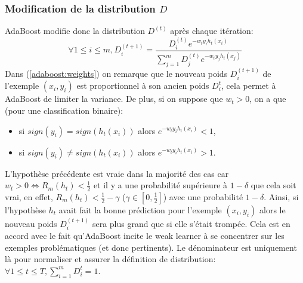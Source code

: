 \documentclass[12pt]{article}
\begin{document}
	
	\subsubsection{Modification de la distribution $D$}
	\label{adaboost:newdistrib}
	AdaBoost modifie donc la distribution $D^{(t)}$ après chaque itération: 
	\begin{equation}
		\label{adaboost:weights}
		\forall 1 \leq i \leq m, D^{(t+1)}_i = \frac{D^{(t)}_i e^{-w_t y_i h_t(x_i)}}{\sum_{j=1}^m D^{(t)}_j e^{-w_t y_j h_t(x_j)}} 
	\end{equation}   
	Dans (\ref{adaboost:weights}) on remarque que le nouveau poids $D^{(t+1)}_i$ de l'exemple $(x_i,y_i)$ est proportionnel à son ancien poids $D^{t}_i$, cela permet à AdaBoost de limiter la variance. De plus, si on suppose que $w_t > 0$, on a que (pour une classification binaire):
	\begin{itemize}
		\item si $sign(y_i)=sign(h_t(x_i))$ alors $e^{-w_t y_i h_t(x_i)} < 1$,
		\item si $sign(y_i) \neq sign(h_t(x_i))$ alors $e^{-w_t y_i h_t(x_i)} > 1$. 
	\end{itemize}
	L'hypothèse précédente est vraie dans la majorité des cas car $w_t > 0 \Leftrightarrow R_m(h_t) < \frac{1}{2}$ et il y a une probabilité supérieure à $1-\delta$ que cela soit vrai, en effet, $R_m(h_t) < \frac{1}{2} - \gamma$ ($\gamma \in [0,\frac{1}{2}]$) avec une probabilité $1-\delta$.
	Ainsi, si l'hypothèse $h_t$ avait fait la bonne prédiction pour l'exemple $(x_i,y_i)$ alors le nouveau poids $D^{(t+1)}_i$ sera plus grand que si elle s'était trompée. Cela est en accord avec le fait qu'AdaBoost incite le weak learner à se concentrer sur les exemples problématiques (et donc pertinents).
	Le dénominateur est uniquement là pour normaliser et assurer la définition de distribution: $\forall 1 \leq t \leq T, \sum_{i=1}^m D^t_i = 1$.
	
\end{document}
